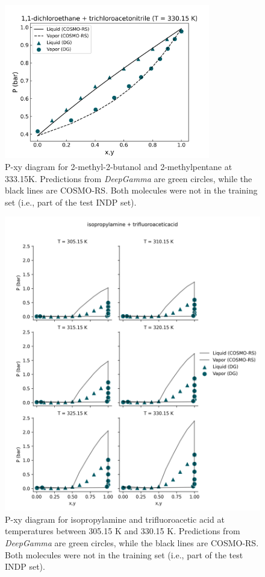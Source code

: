 \begin{figure}
    \centering
    \includegraphics[trim=0 0 0 40, clip, width=0.8\textwidth]{gfx/Chapter07/low_error_pxy.png}
    \caption{P-xy diagram for 2-methyl-2-butanol and 2-methylpentane at 333.15K. Predictions from \textit{DeepGamma} are green circles, while the black lines are COSMO-RS. Both molecules were not in the training set (i.e., part of the test INDP set).}
    \label{fig:low_error_dg_prediction}
\end{figure}

\begin{figure}
    \centering
    \includegraphics[trim=0 0 0 40, clip, width=\textwidth]{gfx/Chapter07/high_error_pxy.png}
    \caption{P-xy diagram for isopropylamine and trifluoroacetic acid at temperatures between 305.15 K and 330.15 K. Predictions from \textit{DeepGamma} are green circles, while the black lines are COSMO-RS. Both molecules were not in the training set (i.e., part of the test INDP set).}
    \label{fig:high_error_dg_prediction}
\end{figure}



